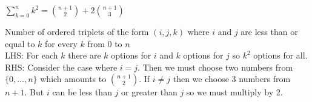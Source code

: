 \question $\sum\limits_{k = 0}^{n} k^2 = \binom{n + 1}{2} + 2\binom{n + 1}{3}$ \\

\begin{solution}[4 cm]
Number of ordered triplets of the form $(i, j, k)$ where $i$ and $j$ 
are less than or equal to $k$ for every $k$ from 0 to $n$ \\
LHS: For each $k$ there are $k$ options for $i$ and $k$ options for 
$j$ so $k^2$ options for all. \\
RHS: Consider the case where $i = j$. Then we must choose two numbers 
from $\{0, \ldots, n\}$ which amounts to $\binom{n + 1}{2}$. 
If $i \neq j$ then we choose 3 numbers from $n + 1$. But $i$ can be 
less than $j$ or greater than $j$ so we must multiply by 2.
\end{solution}